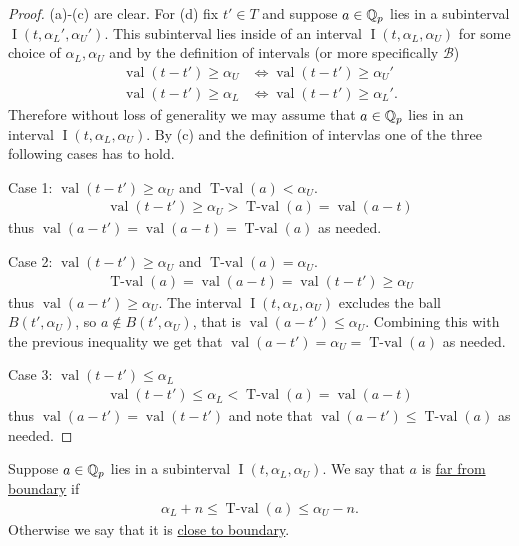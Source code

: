 \documentclass{amsart}
\newcommand{\BB}{\mathscr B}
\DeclareMathOperator{\val}{val}
\DeclareMathOperator{\vval}{val}
\DeclareMathOperator{\tval}{T-val}
\DeclareMathOperator{\inti}{I}
\newcommand{\defn}{\underline}
\newcommand{\interval}{\inti(t, \alpha_L, \alpha_U)}
\begin{document}
\begin{proof}
  (a)-(c) are clear.
  For (d) fix $t' \in T$ and suppose $a \in \mathbb{Q}_p$ lies in a subinterval $\inti(t, \alpha_L', \alpha_U')$.
  This  subinterval lies inside of an interval $\interval$ for some choice of $\alpha_L, \alpha_U$ and
  by the definition of intervals (or more specifically $\BB$)
  \begin{align*}
    \vval(t - t') \geq \alpha_U &\iff \vval(t - t') \geq \alpha_U'\\
    \vval(t - t') \geq \alpha_L &\iff \vval(t - t') \geq \alpha_L'.
  \end{align*}
  Therefore without loss of generality we may assume that $a \in \mathbb{Q}_p$ lies in an interval $\interval$.
  By (c) and the definition of intervlas one of the three following cases has to hold.
  
  Case 1: $\vval(t - t') \geq \alpha_U$ and $\tval(a) < \alpha_U$.
  \begin{align*}
    \vval(t - t') \geq \alpha_U > \tval(a) = \vval(a - t)
  \end{align*}
  thus $\vval(a - t') = \vval(a - t) = \tval(a)$ as needed.

  Case 2: $\vval(t - t') \geq \alpha_U$ and $\tval(a) = \alpha_U$.
  \begin{align*}
    \tval(a) = \vval(a - t) = \vval(t - t') \geq \alpha_U
  \end{align*}
  thus $\vval(a - t') \geq \alpha_U$.
  The interval $\interval$ excludes the ball $B(t', \alpha_U)$,
  so $a \notin B(t', \alpha_U)$, that is $\val(a - t') \leq \alpha_U$.
  Combining this with the previous inequality we get that $\val(a - t') = \alpha_U = \tval(a)$ as needed.

  Case 3: $\vval(t - t') \leq \alpha_L$
  \begin{align*}
    \vval(t - t') \leq \alpha_L < \tval(a) = \vval(a - t)
  \end{align*}
  thus $\vval(a - t') = \vval(t - t')$ and note that $\vval(a - t') \leq \tval(a)$ as needed.
\end{proof}




\begin{Definition}
  Suppose $a \in \mathbb{Q}_p$ lies in a subinterval $\interval$.
  We say that $a$ is \defn{far from boundary} if 
    \begin{align*}
	\alpha_L + n \leq \tval(a) \leq \alpha_U - n.
    \end{align*}
  Otherwise we say that it is \defn{close to boundary}.
\end{Definition}
\end{document}
